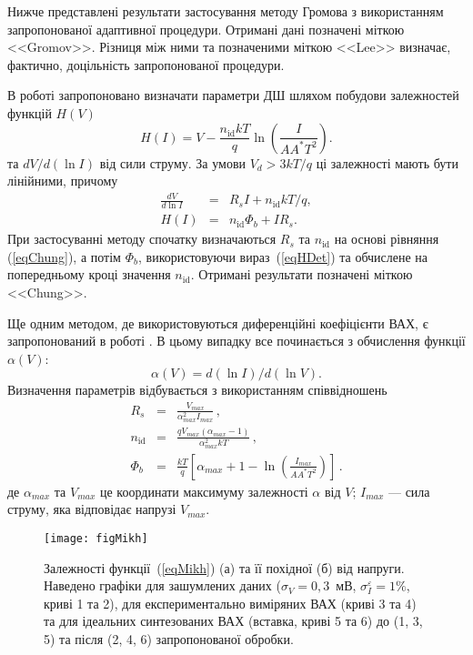 Нижче представлені результати застосування методу Громова з використанням запропонованої адаптивної процедури.
Отримані дані позначені міткою <<Gromov>>.
Різниця між ними та позначеними міткою <<Lee>> визначає, фактично, доцільність запропонованої процедури.

В роботі \cite{Cheung} запропоновано визначати параметри ДШ шляхом побудови залежностей функцій $H(V)$
\begin{equation}
\label{eqH}
H(I)=V-\frac{n_\mathrm{id}kT}{q}\ln\left(\frac{I}{AA^*T^2}\right).
\end{equation}
та $dV/d(\ln I)$ від сили струму.
За умови $V_d>3kT/q$ ці залежності мають бути лінійними, причому
\begin{eqnarray}
\label{eqChung}
\frac{dV}{d\ln I}&=&R_sI+n_\mathrm{id}kT/q,
\\
\label{eqHDet}
H(I)&=&n_\mathrm{id}\Phi_b+IR_s.
\end{eqnarray}
При застосуванні методу спочатку визначаються $R_s$ та  $n_\mathrm{id}$ на основі рівняння (\ref{eqChung}),
а потім  $\Phi_b$, використовуючи вираз~(\ref{eqHDet}) та обчислене на попередньому кроці значення $n_\mathrm{id}$.
Отримані результати позначені міткою <<Chung>>.

Ще одним методом, де використовуються диференційні коефіцієнти ВАХ, є запропонований в роботі \cite{Mikhelashvili}.
В цьому випадку все починається з обчислення функції  $\alpha(V)$:
\begin{equation}
\label{eqMikh}
\alpha(V)=d(\ln I)/d(\ln V).
\end{equation}
Визначення параметрів відбувається з використанням співвідношень
\begin{eqnarray}
\label{eqMikhDet}
R_s&=&\frac{V_{max}}{\alpha^2_{max}I_{max}}\,,
\\
n_\mathrm{id}&=&\frac{qV_{max}(\alpha_{max}-1)}{\alpha_{max}^2kT}\,,
\\
\Phi_b&=&\frac{kT}{q}\left[\alpha_{max}+1-\ln\left(\frac{I_{max}}{AA^*T^2}\right)\right]\,.\label{eqMikhDetFi}
\end{eqnarray}
де
$\alpha_{max}$ та $V_{max}$  це координати максимуму залежності $\alpha$ від $V$;
$I_{max}$ --- сила струму, яка відповідає напрузі $V_{max}$.

\begin{figure}
\center
\texttt{[image: figMikh]}%
\caption{\label{figMikh}
Залежності функції~(\ref{eqMikh}) (а) та її похідної (б) від напруги.
Наведено графіки для зашумлених даних ($\sigma_V=0,3$~мВ, $\sigma_I^\varepsilon=1\%$, криві 1 та 2), для експериментально виміряних ВАХ (криві 3 та 4) та для ідеальних синтезованих ВАХ (вставка, криві 5 та 6) до (1, 3, 5) та після (2, 4, 6) запропонованої обробки.
}
\end{figure}

